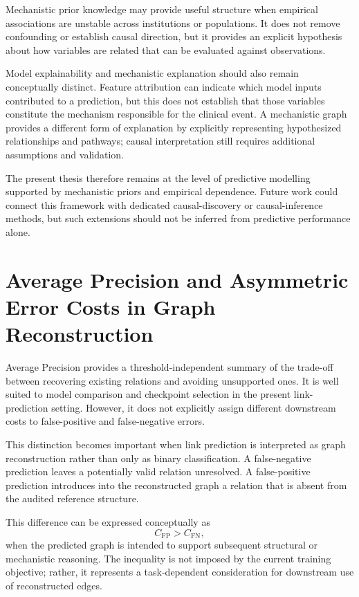Mechanistic prior knowledge may provide useful structure when empirical associations are
unstable across institutions or populations. It does not remove confounding or establish
causal direction, but it provides an explicit hypothesis about how variables are related that
can be evaluated against observations.

Model explainability and mechanistic explanation should also remain conceptually distinct.
Feature attribution can indicate which model inputs contributed to a prediction, but this
does not establish that those variables constitute the mechanism responsible for the
clinical event. A mechanistic graph provides a different form of explanation by explicitly
representing hypothesized relationships and pathways; causal interpretation still requires
additional assumptions and validation.

The present thesis therefore remains at the level of predictive modelling supported by
mechanistic priors and empirical dependence. Future work could connect this framework
with dedicated causal-discovery or causal-inference methods, but such extensions should
not be inferred from predictive performance alone.

\section{Average Precision and Asymmetric Error Costs in Graph Reconstruction}
\label{sec:joint-ap-reconstruction}

Average Precision provides a threshold-independent summary of the trade-off between
recovering existing relations and avoiding unsupported ones.
It is well suited to model comparison and checkpoint selection in the present
link-prediction setting.
However, it does not explicitly assign different downstream costs to false-positive and
false-negative errors.

This distinction becomes important when link prediction is interpreted as graph
reconstruction rather than only as binary classification.
A false-negative prediction leaves a potentially valid relation unresolved.
A false-positive prediction introduces into the reconstructed graph a relation that is absent
from the audited reference structure.

This difference can be expressed conceptually as
\begin{equation}
\label{eq:joint-cfp-cfn}
C_{\mathrm{FP}}>C_{\mathrm{FN}},
\end{equation}
when the predicted graph is intended to support subsequent structural or mechanistic
reasoning.
The inequality is not imposed by the current training objective; rather, it represents a
task-dependent consideration for downstream use of reconstructed edges.

